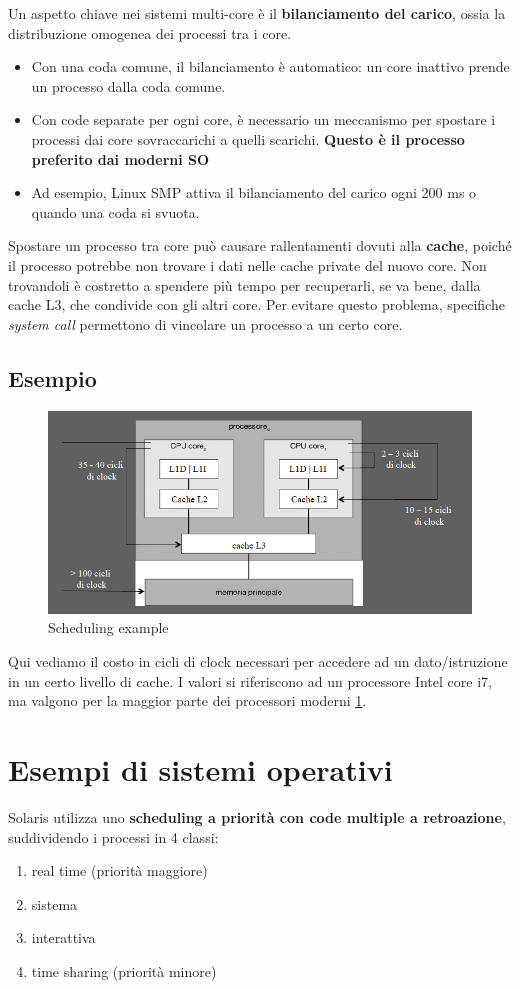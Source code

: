 Un aspetto chiave nei sistemi multi-core è il \textbf{bilanciamento del carico}, ossia la distribuzione omogenea dei processi tra i core.
\begin{itemize}
    \item Con una coda comune, il bilanciamento è automatico: un core inattivo prende un processo dalla coda comune.
    \item Con code separate per ogni core, è necessario un meccanismo per spostare i processi dai core sovraccarichi a quelli scarichi. \textbf{Questo è il processo preferito dai moderni SO}
    \item Ad esempio, Linux SMP attiva il bilanciamento del carico ogni 200 ms o quando una coda si svuota.
\end{itemize}

Spostare un processo tra core può causare rallentamenti dovuti alla \textbf{cache}, poiché il processo potrebbe non trovare i dati nelle cache private del nuovo core.
Non trovandoli è costretto a spendere più tempo per recuperarli, se va bene, dalla cache L3, che condivide con gli altri core. Per evitare questo problema, specifiche \textit{system call} permettono di vincolare un processo a un certo core.

\subsection{Esempio}

\begin{figure}[h]
    \centering
    \includegraphics[width=0.5\linewidth]{images/Scheduling_multi_core_i7.png}
    \caption{Scheduling example}
    \label{fig:schedi7}
\end{figure}
Qui vediamo il costo in cicli di clock necessari per accedere ad un dato/istruzione in un certo livello di cache. I valori si riferiscono ad un processore Intel core i7, ma valgono per la maggior parte dei processori moderni \ref{fig:schedi7}.

\section{Esempi di sistemi operativi}
Solaris utilizza uno \textbf{scheduling a priorità con code multiple a retroazione}, suddividendo i processi in 4 classi:
\begin{enumerate}
    \item real time (priorità maggiore)
    \item sistema
    \item interattiva
    \item time sharing (priorità minore)
\end{enumerate}

